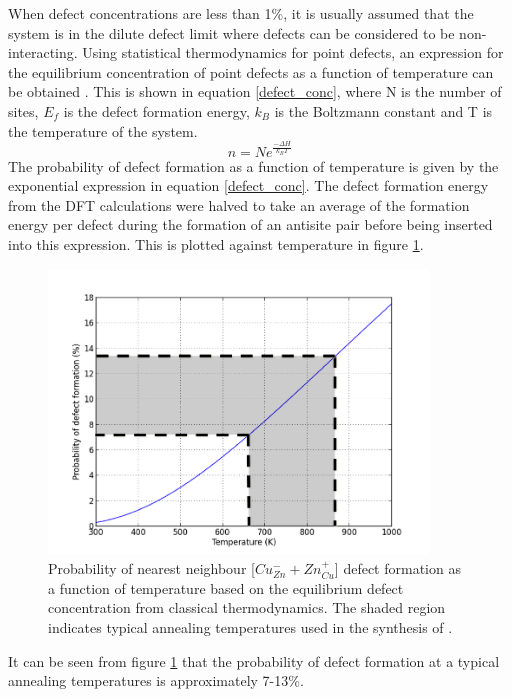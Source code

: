 When defect concentrations are less than 1\%, it is usually assumed that the system is in the dilute defect limit where defects can be considered to be non-interacting. Using statistical thermodynamics for point defects, an expression for the equilibrium concentration of point defects as a function of temperature can be obtained \cite{thermodynamics}. This is shown in equation \ref{defect_conc}, where N is the number of sites, $E_f$ is the defect formation energy, $k_B$ is the Boltzmann constant and T is the temperature of the system.
\begin{equation} \label{defect_conc}
n = Ne^{\frac{-\Delta H}{k_BT}}
\end{equation}
The probability of defect formation as a function of temperature is given by the exponential expression in equation \ref{defect_conc}. The defect formation energy from the DFT calculations were halved to take an average of the formation energy per defect during the formation of an antisite pair before being inserted into this expression. This is plotted against temperature in figure \ref{Cu-Zn_eqm_conc}. 
\begin{figure}[h!]
  \centering
    \includegraphics[width=0.9\textwidth]{figures/Cu-Zn_eqm_conc.png}
    \caption{Probability of nearest neighbour [$Cu_{Zn}^- + Zn_{Cu}^+$] defect formation as a function of temperature based on the equilibrium defect concentration from classical thermodynamics. The shaded region indicates typical annealing temperatures used in the synthesis of {\CZTS}.}
  \label{Cu-Zn_eqm_conc}
\end{figure}
It can be seen from figure \ref{Cu-Zn_eqm_conc} that the probability of defect formation at a typical annealing temperatures is approximately 7-13\%.
